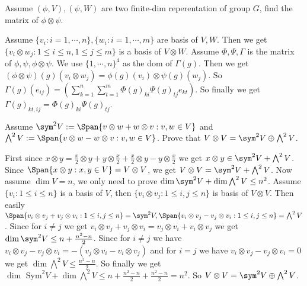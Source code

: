 \documentclass{ctexart}
\newif\ifpreface
\begin{document}
\large
\setlength{\baselineskip}{1.2em}
\ifpreface
	
	\newgeometry{left=2cm,right=2cm,top=2cm,bottom=2cm}
\else
	\maketitle
\fi
\begin{problem}
Assume \((\phi,V),(\psi,W)\) are two finite-dim reperentation of group \(G\), find the matrix of \(\phi \otimes \psi\).
\end{problem}

\begin{solution}
	Assume \(\{ v_i:i=1,\cdots,n\},\{ w_i:i=1,\cdots ,m\}\) are basis of \(V,W\). Then we get \(\{ v_i \otimes w_j:1 \leq i \leq n,1 \leq j \leq m\}\) is a basis of \(V \otimes W\).
	Assume \(\Phi,\Psi,\Gamma\) is the matrix of \(\phi,\psi,\phi \otimes \psi\).
  We use \(\{ 1,\cdots,n\}^4\) as the dom of \(\Gamma( g)\). 
	Then we get \(( \phi \otimes \psi)( g)( v_i \otimes w_j)=\phi( g)( v_i)\otimes \psi( g)( w_j)\).
	So \(\Gamma( g)( e_{ij})=( \sum_{k=1}^{n}\sum_{t=1}^{m} \Phi( g)_{ki} \Psi( g)_{tj} e_{kt})\).
	So finally we get \(\Gamma( g)_{k t,i j}=\Phi( g)_{ki}\Psi( g)_{tj}\).
\end{solution}

\begin{problem}
Assume \(\sym^2 V:=\Span\{ v \otimes w + w \otimes v:v,w \in V\}\) and \(\bigwedge^2 V:=\Span\{ v \otimes w - w \otimes v:v,w \in V\}\).
Prove that \(V \otimes V = \sym^2 V \oplus \bigwedge^2 V\).
\end{problem}

\begin{solution}
	First since \(x \otimes y = \frac{x}{2} \otimes y + y \otimes \frac{x}{2} + \frac{x}{2}\otimes y - y \otimes \frac{x}{2}\) we get 
  \(x \otimes y \in \sym^2 V+ \bigwedge^2 V\). Since \(\Span\{ x \otimes y:x,y \in V\}=V \otimes V\), we get
  \(V \otimes V = \sym^2 V + \bigwedge^2 V\).
	Now assume \(\dim V=n\), we only need to prove \(\dim\sym^2 V + \dim \bigwedge^2 V \leq n^2\).
	Assume \(\{ v_i:1 \leq i \leq n\}\) is a basis of \(V\), then \(\{v_i \otimes v_j:1 \leq i,j \leq n\}\) is basis of \(V \otimes V\).
	Then easily \(\Span\{ v_i \otimes v_j + v_j \otimes v_i:1 \leq i,j \leq n\}=\sym^2 V,\Span\{ v_i \otimes v_j - v_j \otimes v_i : 1 \leq i,j \leq n\}=\bigwedge^2 V\).
	Since for \(i \neq j\) we get \(v_i \otimes v_j+v_j \otimes v_i=v_j \otimes v_i + v_i \otimes v_j\) we get \(\dim \sym^2 V \leq n+\frac{n^2-n}{2}\).
	Since for \(i \neq j\) we have \(v_i \otimes v_j - v_j \otimes v_i = -( v_j \otimes v_i - v_i \otimes v_j)\) and for \(i = j \) we have \(v_i \otimes v_j - v_j \otimes v_i=0\) we get \(\dim \bigwedge^2 V \leq \frac{n^2-n}{2}\).
	So finally we get \(\dim \text{ Sym}^2 V +\dim \bigwedge^2 V \leq n+\frac{n^2-n}{2}+\frac{n^2-n}{2}=n^2\).
	So \(V \otimes V=\sym^2 V \oplus \bigwedge^2 V\).
\end{solution}
\end{document}
